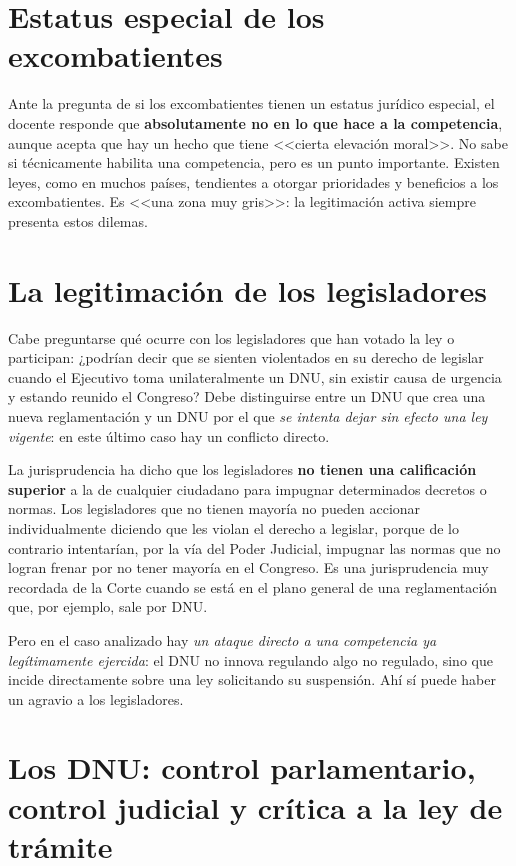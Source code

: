 \documentclass[12pt,oneside]{book}
\begin{document}
\section{Estatus especial de los excombatientes}

Ante la pregunta de si los excombatientes tienen un estatus jurídico especial, el docente responde que \textbf{absolutamente no en lo que hace a la competencia}, aunque acepta que hay un hecho que tiene <<cierta elevación moral>>. No sabe si técnicamente habilita una competencia, pero es un punto importante. Existen leyes, como en muchos países, tendientes a otorgar prioridades y beneficios a los excombatientes. Es <<una zona muy gris>>: la legitimación activa siempre presenta estos dilemas.

\section{La legitimación de los legisladores}

Cabe preguntarse qué ocurre con los legisladores que han votado la ley o participan: ¿podrían decir que se sienten violentados en su derecho de legislar cuando el Ejecutivo toma unilateralmente un DNU, sin existir causa de urgencia y estando reunido el Congreso? Debe distinguirse entre un DNU que crea una nueva reglamentación y un DNU por el que \textit{se intenta dejar sin efecto una ley vigente}: en este último caso hay un conflicto directo.

La jurisprudencia ha dicho que los legisladores \textbf{no tienen una calificación superior} a la de cualquier ciudadano para impugnar determinados decretos o normas. Los legisladores que no tienen mayoría no pueden accionar individualmente diciendo que les violan el derecho a legislar, porque de lo contrario intentarían, por la vía del Poder Judicial, impugnar las normas que no logran frenar por no tener mayoría en el Congreso. Es una jurisprudencia muy recordada de la Corte cuando se está en el plano general de una reglamentación que, por ejemplo, sale por DNU.

Pero en el caso analizado hay \textit{un ataque directo a una competencia ya legítimamente ejercida}: el DNU no innova regulando algo no regulado, sino que incide directamente sobre una ley solicitando su suspensión. Ahí sí puede haber un agravio a los legisladores.

\section{Los DNU: control parlamentario, control judicial y crítica a la ley de trámite}
\end{document}
